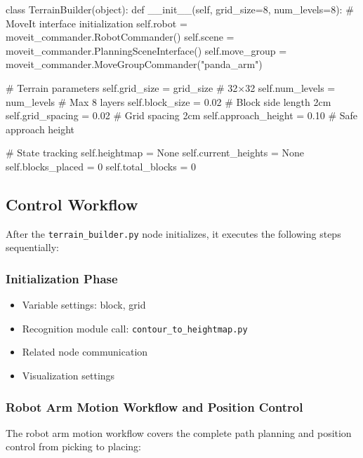 \documentclass[12pt, a4paper]{article}
\begin{document}
\begin{pythoncode}
class TerrainBuilder(object):
    def __init__(self, grid_size=8, num_levels=8):
        # MoveIt interface initialization
        self.robot = moveit_commander.RobotCommander()
        self.scene = moveit_commander.PlanningSceneInterface()
        self.move_group = moveit_commander.MoveGroupCommander("panda_arm")
        
        # Terrain parameters
        self.grid_size = grid_size          # 32×32
        self.num_levels = num_levels        # Max 8 layers
        self.block_size = 0.02              # Block side length 2cm
        self.grid_spacing = 0.02            # Grid spacing 2cm
        self.approach_height = 0.10         # Safe approach height
        
        # State tracking
        self.heightmap = None
        self.current_heights = None
        self.blocks_placed = 0
        self.total_blocks = 0
\end{pythoncode}

\subsection{Control Workflow}

After the \texttt{terrain\_builder.py} node initializes, it executes the following steps sequentially:

\subsubsection{Initialization Phase}

\begin{itemize}
    \item Variable settings: block, grid
    \item Recognition module call: \texttt{contour\_to\_heightmap.py}
    \item Related node communication
    \item Visualization settings
\end{itemize}

\subsubsection{Robot Arm Motion Workflow and Position Control}

The robot arm motion workflow covers the complete path planning and position control from picking to placing:
\end{document}
